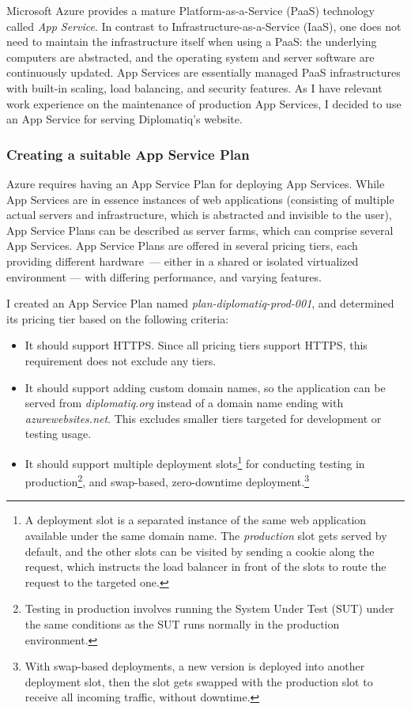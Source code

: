 Microsoft Azure provides a mature Platform-as-a-Service (PaaS) technology called \emph{App Service}. In contrast to Infrastructure-as-a-Service (IaaS), one does not need to maintain the infrastructure itself when using a PaaS: the underlying computers are abstracted, and the operating system and server software are continuously updated. App Services are essentially managed PaaS infrastructures with built-in scaling, load balancing, and security features. As I have relevant work experience on the maintenance of production App Services, I decided to use an App Service for serving Diplomatiq's website.

\subsubsection{Creating a suitable App Service Plan}

Azure requires having an App Service Plan for deploying App Services. While App Services are in essence instances of web applications (consisting of multiple actual servers and infrastructure, which is abstracted and invisible to the user), App Service Plans can be described as server farms, which can comprise several App Services. App Service Plans are offered in several pricing tiers, each providing different hardware — either in a shared or isolated virtualized environment — with differing performance, and varying features.

I created an App Service Plan named \emph{plan-diplomatiq-prod-001}, and determined its pricing tier based on the following criteria:

\begin{itemize}
\item It should support HTTPS. Since all pricing tiers support HTTPS, this requirement does not exclude any tiers.
\item It should support adding custom domain names, so the application can be served from \emph{diplomatiq.org} instead of a domain name ending with \emph{azurewebsites.net}. This excludes smaller tiers targeted for development or testing usage.
\item It should support multiple deployment slots\footnote{A deployment slot is a separated instance of the same web application available under the same domain name. The \emph{production} slot gets served by default, and the other slots can be visited by sending a cookie along the request, which instructs the load balancer in front of the slots to route the request to the targeted one.} for conducting testing in production\footnote{Testing in production involves running the System Under Test (SUT) under the same conditions as the SUT runs normally in the production environment.}, and swap-based, zero-downtime deployment.\footnote{With swap-based deployments, a new version is deployed into another deployment slot, then the slot gets swapped with the production slot to receive all incoming traffic, without downtime.}
\end{itemize}

